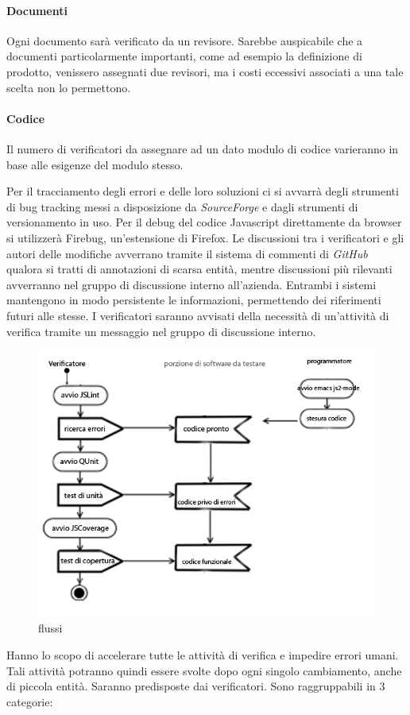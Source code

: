  
\paragraph{Documenti} Ogni documento sar\`a verificato da un revisore. Sarebbe auspicabile che a documenti particolarmente importanti, come ad esempio la definizione di prodotto, venissero assegnati due revisori, ma i costi eccessivi associati a una tale scelta non lo permettono.
\paragraph{Codice} Il numero di verificatori da assegnare ad un dato modulo di codice varieranno in base alle esigenze del modulo stesso.
 
Per il tracciamento degli errori e delle loro soluzioni ci si avvarr\`a degli strumenti di bug tracking messi a disposizione da \textit{SourceForge} e dagli strumenti di versionamento in uso. Per il debug del codice Javascript direttamente da browser si utilizzer\`a Firebug, un'estensione di Firefox. Le discussioni tra i verificatori e gli autori delle modifiche avverrano tramite il sistema di commenti di \textit{GitHub} qualora si tratti di annotazioni di scarsa entit\`a, mentre discussioni pi\`u rilevanti avverranno nel gruppo di discussione interno all'azienda. Entrambi i sistemi mantengono in modo persistente le informazioni, permettendo dei riferimenti futuri alle stesse. I verificatori saranno avvisati della necessit\`a di un'attivit\`a di verifica tramite un messaggio nel gruppo di discussione interno.


\begin{figure}[!ht]
\centering
\includegraphics[scale=0.5]{flussi.png}
\caption{flussi}
\end{figure} 
Hanno lo scopo di accelerare tutte le attivit\`a di verifica e impedire errori umani.
Tali attivit\`a potranno quindi essere svolte dopo ogni singolo cambiamento, anche di piccola entit\`a. Saranno predisposte dai verificatori.
Sono raggruppabili in 3 categorie:

